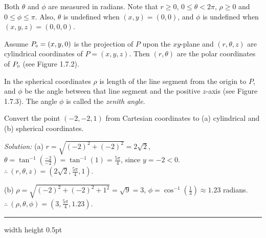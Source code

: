 \bigskip
{}
\smallskip

\par Both $\theta$ and $\phi$ are measured in radians.
Note that $r \ge 0$, $0 \le \theta < 2\pi$, $\rho \ge 0$ and $0 \le \phi \le \pi$.
Also, $\theta$ is undefined when $(x,y) = (0,0)$, and $\phi$ is undefined when $(x,y,z) = (0,0,0)$.

Assume $P_{\scriptscriptstyle 0} = (x,y,0)$ is the projection of $P$ upon the
$xy$-plane and $(r,\theta,z)$ are cylindrical coordinates of $P=(x,y,z)$.
Then $(r,\theta)$ are the polar coordinates of $P_{\scriptscriptstyle 0}$ (see
Figure 1.7.2).

In the spherical coordinates
$\rho$ is length of the line segment from the origin to $P$, 
and $\phi$ be the angle between that line segment
and the positive $z$-axis (see Figure 1.7.3).
The angle $\phi$ is called the \emph{zenith angle}. 

\begin{exmp}
 Convert the point $(-2,-2,1)$ from Cartesian coordinates to (a) cylindrical and (b) spherical
 coordinates.\smallskip
 \par\noindent\emph{Solution:} (a) $r = \sqrt{(-2)^2 + (-2)^2} = 2\sqrt{2}$, $\theta =
 \tan^{-1} \left( \frac{-2}{-2} \right) = \tan^{-1}(1) = \frac{5 \pi}{4}$, since $y = -2 < 0$.\\
 $\therefore ~ (r,\theta,z) = \left( 2\sqrt{2},\frac{5 \pi}{4},1 \right)$.\smallskip
 \par\noindent (b) $\rho = \sqrt{(-2)^2 + (-2)^2 + 1^2} = \sqrt{9} = 3$, $\phi = \cos^{-1} \left( \frac{1}{3} \right)
 \approx 1.23$ radians.\\
 $\therefore ~ (\rho,\theta,\phi) = \left( 3,\frac{5 \pi}{4}, 1.23 \right)$.
 \end{exmp}
\hrule width \textwidth height 0.5pt
\smallskip

